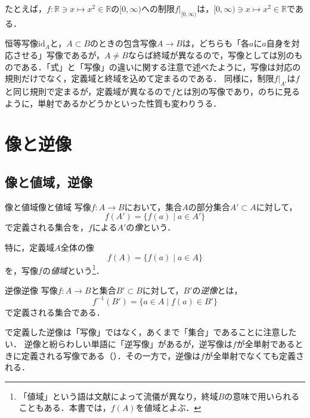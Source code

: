 たとえば，$f \colon \mathbb{R} \ni x \mapsto x^2 \in \mathbb{R}$の$[0, \infty)$への制限$f|_{[0, \infty)}$は，$[0, \infty) \ni x \mapsto x^2 \in \mathbb{R}$である．

\begin{remark}[恒等写像と包含写像の違い]
  恒等写像$\mathrm{id}_A$と，$A \subset B$のときの包含写像$A \to B$は，どちらも「各$a$に$a$自身を対応させる」写像であるが，$A \ne B$ならば終域が異なるので，写像としては別のものである．「式」と「写像」の違いに関する注意で述べたように，写像は対応の規則だけでなく，定義域と終域を込めて定まるのである．
  同様に，制限$f|_{A'}$は$f$と同じ規則で定まるが，定義域が異なるので$f$とは別の写像であり，のちに見るように，単射であるかどうかといった性質も変わりうる．
\end{remark}

\section{像と逆像}

\subsection{像と値域，逆像}

\begin{definition}{像と値域}{像と値域}
  写像$f \colon A \to B$において，集合$A$の部分集合$A' \subset A$に対して，
  \[
    f(A') = \{ f(a) \mid a \in A' \}
  \]
  で定義される集合を，$f$による$A'$の\emph{像}という．

  特に，定義域$A$全体の像
  \[
    f(A) = \{ f(a) \mid a \in A \}
  \]
  を，写像$f$の\emph{値域}という\footnote{「値域」という語は文献によって流儀が異なり，終域$B$の意味で用いられることもある．本書では，$f(A)$を値域とよぶ．}．

   
\end{definition}


\begin{definition}{逆像}{逆像}
  写像$f \colon A \to B$と集合$B' \subset B$に対して，$B'$の\emph{逆像}とは，
  \[
    f^{-1}(B') = \{ a \in A \mid f(a) \in B' \}
  \]
  で定義される集合である．

\end{definition}

\begin{remark}[逆像と逆写像]
  で定義した逆像は「写像」ではなく，あくまで「集合」であることに注意したい．
  逆像と紛らわしい単語に「逆写像」があるが，逆写像は$f$が全単射であるときに定義される写像である（）．その一方で，逆像は$f$が全単射でなくても定義される．
\end{remark}

